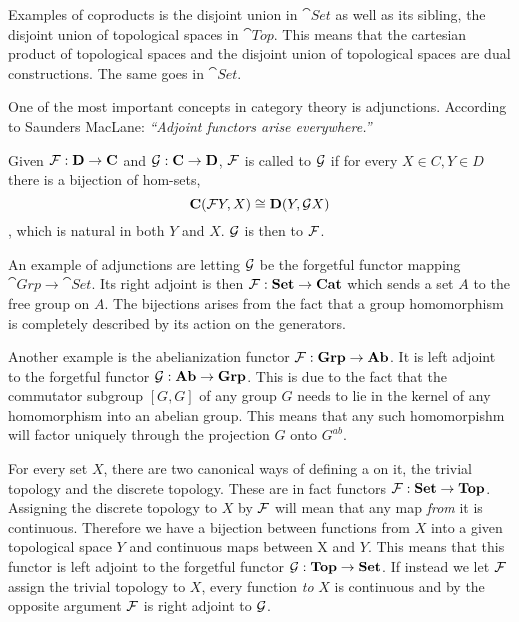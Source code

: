 \documentclass[../../main.tex]{subfiles}
\begin{document}
    
    Examples of coproducts is the disjoint union in $\cat{Set}$ as well as its sibling, the disjoint union of topological spaces in $\cat{Top}$. This means that the cartesian product of topological spaces and the disjoint union of topological spaces are dual constructions. The same goes in $\cat{Set}$.
    
    One of the most important concepts in category theory is adjunctions. According to Saunders MacLane: \textit{“Adjoint functors arise everywhere.”}
    
    \begin{definition}
        Given $\mathcal{F}: \mathbf{D} \to \mathbf{C}$ and $\mathcal{G}: \mathbf{C} \to \mathbf{D}$, $\mathcal{F}$ is called  to $\mathcal{G}$ if for every $X \in C, Y \in D$ there is a bijection of hom-sets, $$\mathbf{C}(\mathcal{F}Y, X) \cong \mathbf{D}(Y, \mathcal{G}X)$$, which is natural in both $Y$ and $X$. $\mathcal{G}$ is then  to $\mathcal{F}$.
    \end{definition}
    
    An example of adjunctions are letting $\mathcal{G}$ be the forgetful functor mapping $\cat{Grp} \to \cat{Set}$. Its right adjoint is then $\mathcal{F}: \mathbf{Set} \to \mathbf{Cat}$ which sends a set $A$ to the free group on $A$. The bijections arises from the fact that a group homomorphism is completely described by its action on the generators.
    
    Another example is the abelianization functor $\mathcal{F}: \mathbf{Grp} \to \mathbf{Ab}$. It is left adjoint to the forgetful functor $\mathcal{G}: \mathbf{Ab} \to \mathbf{Grp}$. This is due to the fact that the commutator subgroup $[G, G]$ of any group $G$ needs to lie in the kernel of any homomorphism into an abelian group. This means that any such homomorpishm will factor uniquely through the projection $G$ onto $G^{ab}$.
    
    For every set $X$, there are two canonical ways of defining a on it, the trivial topology and the discrete topology. These are in fact functors $\mathcal{F}: \mathbf{Set} \to \mathbf{Top}$. Assigning the discrete topology to $X$ by $\mathcal{F}$ will mean that any map \emph{from} it is continuous. Therefore we have a bijection between functions from $X$ into a given topological space $Y$ and continuous maps between X and $Y$. This means that this functor is left adjoint to the forgetful functor $\mathcal{G}: \mathbf{Top} \to \mathbf{Set}$. If instead we let $\mathcal{F}$ assign the trivial topology to $X$, every function \emph{to} $X$ is continuous and by the opposite argument $\mathcal{F}$ is right adjoint to $\mathcal{G}$.
    
\end{document}
